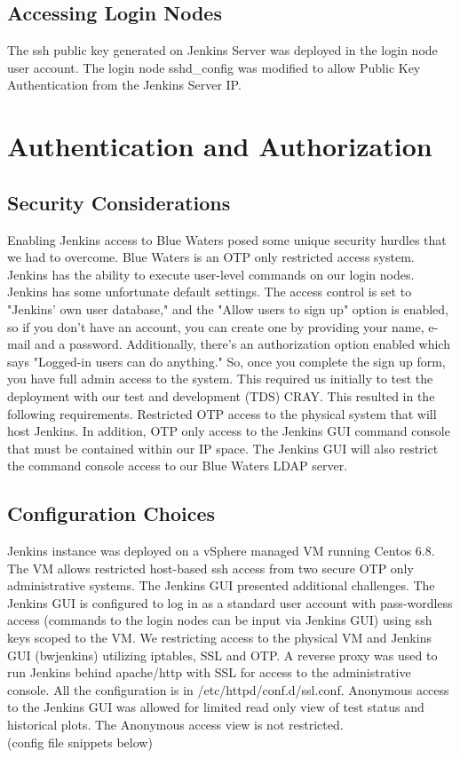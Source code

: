 \documentclass[10pt, conference, compsocconf]{IEEEtran}
\begin{document}
\subsection{Accessing Login Nodes}
The ssh public key generated on Jenkins Server was deployed in the login node user account. The login node sshd_config was modified to allow Public Key Authentication from the Jenkins Server IP.     


\section{Authentication and Authorization}
\label{sec:AuthenticationAuthorization}

\subsection{Security Considerations}
Enabling Jenkins access to Blue Waters posed some unique security hurdles that we had to overcome. Blue Waters is an OTP only restricted access system. Jenkins has the ability to execute user-level commands on our login nodes. Jenkins has some unfortunate default settings. The access control is set to "Jenkins' own user database," and the "Allow users to sign up" option is enabled, so if you don't have an account, you can create one by providing your name, e-mail and a password. Additionally, there's an authorization option enabled which says "Logged-in users can do anything." So, once you complete the sign up form, you have full admin access to the system.  This required us initially to test the deployment with our test and development (TDS) CRAY. This resulted in the following requirements. Restricted OTP access to the physical system that will host Jenkins. In addition, OTP only access to the Jenkins GUI command console that must be contained within our IP space.  The Jenkins GUI will also restrict the command console access to our Blue Waters LDAP server. 

\subsection{Configuration Choices}
Jenkins instance was deployed on a vSphere managed VM running Centos 6.8. The VM allows restricted host-based ssh access from two secure OTP only administrative systems. The Jenkins GUI presented additional challenges. The Jenkins GUI is configured to log in as a standard user account with pass-wordless access (commands to the login nodes can be input via Jenkins GUI) using ssh keys scoped to the VM. We restricting access to the physical VM and Jenkins GUI (bwjenkins) utilizing iptables, SSL and OTP.  A reverse proxy was used to run Jenkins behind apache/http with SSL for access to the administrative console. All the configuration is in /etc/httpd/conf.d/ssl.conf. Anonymous access to the Jenkins GUI was allowed for limited read only view of test status and historical plots. The Anonymous access view is not restricted. \\
(config file snippets below)
\end{document}
